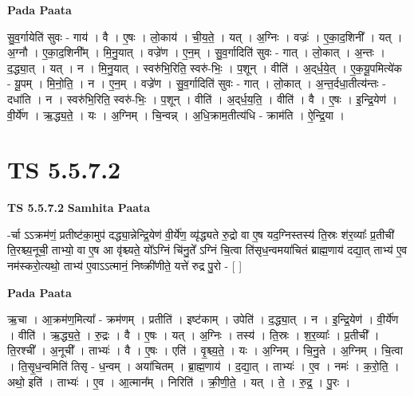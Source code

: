 \documentclass[17pt]{extarticle}
\begin{document}
\textbf{Pada Paata} \newline

सु॒व॒र्गायेति॑ सुवः - गाय॑ । वै । ए॒षः । लो॒काय॑ । ची॒य॒ते॒ । यत् । अ॒ग्निः । वज्रः॑ । ए॒का॒द॒शिनी᳚ । यत् । अ॒ग्नौ । ए॒का॒द॒शिनी᳚म् । मि॒नु॒यात् । वज्रे॑ण । ए॒न॒म् । सु॒व॒र्गादिति॑ सुवः - गात् । लो॒कात् । अ॒न्तः । द॒द्ध्या॒त् । यत् । न । मि॒नु॒यात् । स्वरु॑भि॒रिति॒ स्वरु॑-भिः॒ । प॒शून् । वीति॑ । अ॒द्‌र्ध॒ये॒त् । ए॒क॒यू॒पमित्ये॑क - यू॒पम् । मि॒नो॒ति॒ । न । ए॒न॒म् । वज्रे॑ण । सु॒व॒र्गादिति॑ सुवः - गात् । लो॒कात् । अ॒न्त॒र्दधा॒तीत्य॑न्तः - दधा॑ति । न । स्वरु॑भि॒रिति॒ स्वरु॑-भिः॒ । प॒शून् । वीति॑ । अ॒द्‌र्ध॒य॒ति॒ । वीति॑ । वै । ए॒षः । इ॒न्द्रि॒येण॑ । वी॒र्ये॑ण । ऋ॒द्ध्य॒ते॒ । यः । अ॒ग्निम् । चि॒न्वन्न् । अ॒धि॒क्राम॒तीत्य॑धि - क्राम॑ति । ऐ॒न्द्रि॒या ।  \newline





\section{ TS 5.5.7.2 }

\textbf{TS 5.5.7.2 } \newline
\textbf{Samhita Paata} \newline

-र्चा ऽऽक्रम॑णं॒ प्रतीष्ट॑का॒मुप॑ दद्ध्या॒न्नेन्द्रि॒येण॑ वी॒र्ये॑ण॒ व्यृ॑द्ध्यते रु॒द्रो वा ए॒ष यद॒ग्निस्तस्य॑ ति॒स्रः श॑र॒व्याः᳚ प्र॒तीची॑ ति॒रश्च्य॒नूची॒ ताभ्यो॒ वा ए॒ष आ वृ॑श्च्यते॒ यो᳚ऽग्निं चि॑नु॒ते᳚ ऽग्निं चि॒त्वा ति॑सृध॒न्वमया॑चितं ब्राह्म॒णाय॑ दद्या॒त् ताभ्य॑ ए॒व नम॑स्करो॒त्यथो॒ ताभ्य॑ ए॒वाऽऽत्मानं॒ निष्क्री॑णीते॒ यत्ते॑ रुद्र पु॒रो - [  ] \newline

\textbf{Pada Paata} \newline

ऋ॒चा । आ॒क्रम॑ण॒मित्या᳚ - क्रम॑णम् । प्रतीति॑ । इष्ट॑काम् । उपेति॑ । द॒द्ध्या॒त् । न । इ॒न्द्रि॒येण॑ । वी॒र्ये॑ण । वीति॑ । ऋ॒द्ध्य॒ते॒ । रु॒द्रः । वै । ए॒षः । यत् । अ॒ग्निः । तस्य॑ । ति॒स्रः । श॒र॒व्याः᳚ । प्र॒तीची᳚ । ति॒रश्ची᳚ । अ॒नूची᳚ । ताभ्यः॑ । वै । ए॒षः । एति॑ । वृ॒श्च्य॒ते॒ । यः । अ॒ग्निम् । चि॒नु॒ते । अ॒ग्निम् । चि॒त्वा । ति॒सृ॒ध॒न्वमिति॑ तिसृ - ध॒न्वम् । अया॑चितम् । ब्रा॒ह्म॒णाय॑ । द॒द्या॒त् । ताभ्यः॑ । ए॒व । नमः॑ । क॒रो॒ति॒ । अथो॒ इति॑ । ताभ्यः॑ । ए॒व । आ॒त्मान᳚म् । निरिति॑ । क्री॒णी॒ते॒ । यत् । ते॒ । रु॒द्र॒ । पु॒रः ।  \newline
\end{document}
